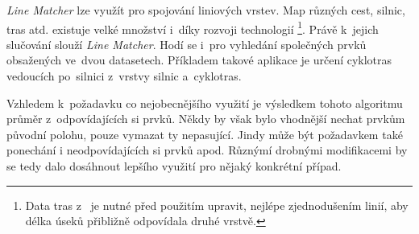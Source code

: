 \textit{Line Matcher} lze využít pro spojování liniových vrstev. Map různých cest, 
silnic, tras atd. existuje velké množství i~díky rozvoji technologií 
\footnote{Data tras z~ je nutné před použitím upravit, nejlépe 
zjednodušením linií, aby délka úseků přibližně odpovídala druhé vrstvě.}. Právě
k~jejich slučování slou\-ží \textit{Line Matcher}. Hodí se i~pro vyhledání 
společných prvků obsažených ve~dvou datasetech. Příkladem takové aplikace je 
určení cyklotras vedoucích po~silnici z~vrstvy silnic a~cyklotras.

Vzhledem k~požadavku co nejobecnějšího využití je výsledkem tohoto algoritmu
průměr z~odpovídajících si prvků.  Někdy by však bylo vhodnější nechat prvkům
původní polohu, pouze vymazat ty nepasující. Jindy může být požadavkem také
ponechání i neodpovídajících si prvků apod. Různýmí drobnými modifikacemi
by se tedy dalo dosáhnout lepšího využití pro nějaký konkrétní případ.
